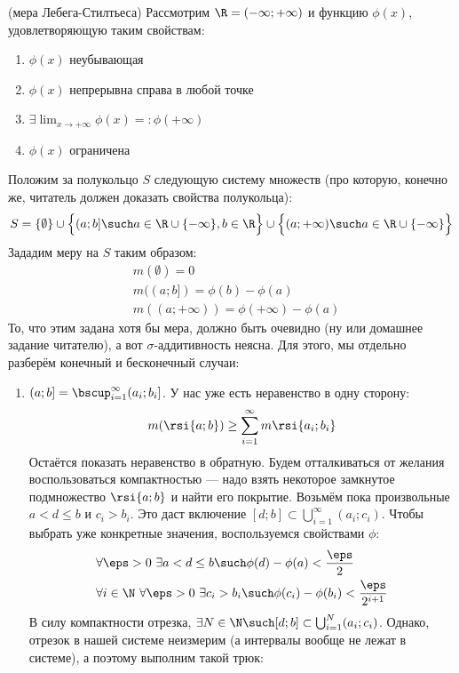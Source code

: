 \begin{example} (мера Лебега-Стилтьеса)
	Рассмотрим $\R = (-\infty; +\infty)$ и функцию $\phi(x)$, удовлетворяющую таким свойствам:
	\begin{enumerate}
		\item $\phi(x)$ неубывающая
		
		\item $\phi(x)$ непрерывна справа в любой точке
		
		\item $\exists \lim_{x \to +\infty} \phi(x) =: \phi(+\infty)$
		
		\item $\phi(x)$ ограничена
	\end{enumerate}
	Положим за полукольцо $S$ следующую систему множеств (про которую, конечно же, читатель должен доказать свойства полукольца):
	\[
		S = \{\emptyset\} \cup \Big\{(a; b] \such a \in \R \cup \{-\infty\}, b \in \R\Big\} \cup \Big\{(a; +\infty) \such a \in \R \cup \{-\infty\}\Big\}
	\]
	Зададим меру на $S$ таким образом:
	\begin{align*}
		&{m(\emptyset) = 0}
		\\
		&{m((a; b]) = \phi(b) - \phi(a)}
		\\
		&{m((a; +\infty)) = \phi(+\infty) - \phi(a)}
	\end{align*}
	То, что этим задана хотя бы мера, должно быть очевидно (ну или домашнее задание читателю), а вот $\sigma$-аддитивность неясна. Для этого, мы отдельно разберём конечный и бесконечный случаи:
	\begin{enumerate}
		\item $(a; b] = \bscup_{i = 1}^\infty (a_i; b_i]$. У нас уже есть неравенство в одну сторону:
		\[
			m(\rsi{a; b}) \ge \sum_{i = 1}^\infty m\rsi{a_i; b_i}
		\]
		Остаётся показать неравенство в обратную. Будем отталкиваться от желания воспользоваться компактностью --- надо взять некоторое замкнутое подмножество $\rsi{a; b}$ и найти его покрытие. Возьмём пока произвольные $a < d \le b$ и $c_i > b_i$. Это даст включение $[d; b] \subset \bigcup_{i = 1}^\infty (a_i; c_i)$. Чтобы выбрать уже конкретные значения, воспользуемся свойствами $\phi$:
		\begin{align*}
			&{\forall \eps > 0\ \exists a < d \le b \such \phi(d) - \phi(a) < \frac{\eps}{2}}
			\\
			&{\forall i \in \N\ \forall \eps > 0\ \exists c_i > b_i \such \phi(c_i) - \phi(b_i) < \frac{\eps}{2^{i + 1}}}
		\end{align*}
		В силу компактности отрезка, $\exists N \in \N \such [d; b] \subset \bigcup_{i = 1}^N (a_i; c_i)$. Однако, отрезок в нашей системе неизмерим (а интервалы вообще не лежат в системе), а поэтому выполним такой трюк:

\end{enumerate}
\end{example}
